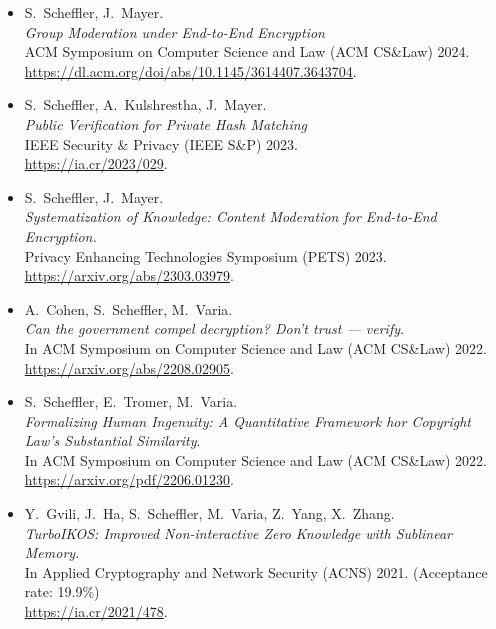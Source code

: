 \documentclass{res}
\begin{document}
\begin{resume}
\begin{itemize}
\item[\eeegroup] S.~Scheffler, J.~Mayer. \\
\emph{Group Moderation under End-to-End Encryption} \\
ACM Symposium on Computer Science and Law (ACM CS\&Law) 2024. \\
\url{https://dl.acm.org/doi/abs/10.1145/3614407.3643704}.

\item[\csamimprovements] S.~Scheffler, A.~Kulshrestha, J.~Mayer. \\
\emph{Public Verification for Private Hash Matching} \\
IEEE Security \& Privacy (IEEE S\&P) 2023. \\
\url{https://ia.cr/2023/029}.

\item[\eeesok] S.~Scheffler, J.~Mayer. \\
\emph{Systematization of Knowledge: Content Moderation for End-to-End Encryption.} \\
Privacy Enhancing Technologies Symposium (PETS) 2023. \\
\url{https://arxiv.org/abs/2303.03979}.

\item[\foregoneVerif] A.~Cohen, S.~Scheffler, M.~Varia. \\
\emph{Can the government compel decryption?  Don't trust --- verify}. \\
In ACM Symposium on Computer Science and Law (ACM CS\&Law) 2022. \\
\url{https://arxiv.org/abs/2208.02905}.

\item[\copyrightMDL] S.~Scheffler, E.~Tromer, M.~Varia. \\
\emph{Formalizing Human Ingenuity: A Quantitative Framework hor Copyright Law's Substantial Similarity}. \\
In ACM Symposium on Computer Science and Law (ACM CS\&Law) 2022. \\
\url{https://arxiv.org/pdf/2206.01230}.

\item[\turboikos] Y.~Gvili, J.~Ha, S.~Scheffler, M.~Varia, Z.~Yang, X.~Zhang. \\
\emph{TurboIKOS: Improved Non-interactive Zero Knowledge with Sublinear Memory.} \\
In Applied Cryptography and Network Security (ACNS) 2021. (Acceptance rate: 19.9\%) \\
\url{https://ia.cr/2021/478}.


\end{itemize}
\end{resume}
\end{document}
